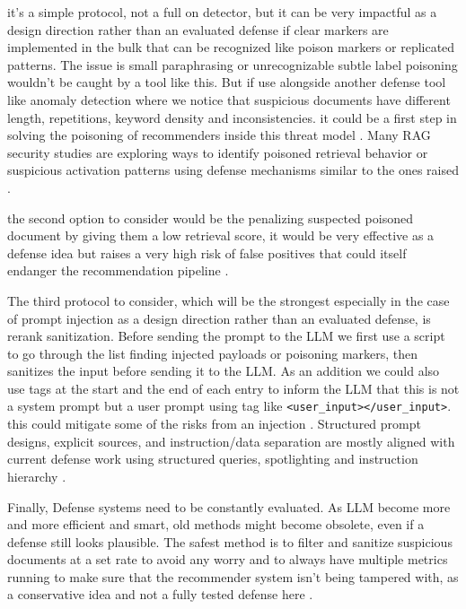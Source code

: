 it's a simple protocol, not a full on detector, but it can be very impactful as a design direction rather than an evaluated defense if clear markers are implemented in the bulk that can be recognized like poison markers or replicated patterns. The issue is small paraphrasing or unrecognizable subtle label poisoning wouldn't be caught by a tool like this. But if use alongside another defense tool like anomaly detection where we notice that suspicious documents have different length, repetitions, keyword density and inconsistencies. it could be a first step in solving the poisoning of recommenders inside this threat model \cite{jia2023pore,nguyen2024manipulatingrecsys,wang2024recpoisonsurvey}. Many RAG security studies are exploring ways to identify poisoned retrieval behavior or suspicious activation patterns using defense mechanisms similar to the ones raised \cite{tan2025revprag,xue2024badrag}.

the second option to consider would be the penalizing suspected poisoned document by giving them a low retrieval score, it would be very effective as a defense idea but raises a very high risk of false positives that could itself endanger the recommendation pipeline \cite{jia2023pore,nguyen2024manipulatingrecsys,wang2024recpoisonsurvey}. 

The third protocol to consider, which will be the strongest especially in the case of prompt injection as a design direction rather than an evaluated defense, is rerank sanitization. Before sending the prompt to the LLM we first use a script to go through the list finding injected payloads or poisoning markers, then sanitizes the input before sending it to the LLM. As an addition we could also use tags at the start and the end of each entry to inform the LLM that this is not a system prompt but a user prompt using tag like \texttt{\textless user\_input\textgreater{}\textless/user\_input\textgreater{}}. this could mitigate some of the risks from an injection \cite{ragpoisonlab_repo}. Structured prompt designs, explicit sources, and instruction/data separation are  mostly aligned with current defense work using structured queries, spotlighting and instruction hierarchy \cite{chen2024struq,hines2024spotlighting,wallace2024instructionhierarchy}. 

Finally, Defense systems need to be constantly evaluated. As LLM become more and more efficient and smart, old methods might become obsolete, even if a defense still looks plausible. The safest method is to filter and sanitize suspicious documents at a set rate to avoid any worry and to always have multiple metrics running to make sure that the recommender system isn't being tampered with, as a conservative idea and not a fully tested defense here \cite{ru2024ragchecker,barnett2024ragfailurepoints,debenedetti2024agentdojo,mazeika2024harmbench}.

